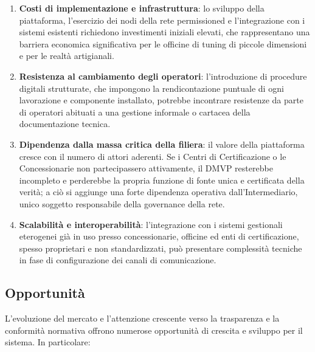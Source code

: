 \begin{enumerate}
    \item \textbf{Costi di implementazione e infrastruttura}: lo sviluppo della piattaforma, l'esercizio dei nodi della rete permissioned e l'integrazione con i sistemi esistenti richiedono investimenti iniziali elevati, che rappresentano una barriera economica significativa per le officine di tuning di piccole dimensioni e per le realtà artigianali.

    \item \textbf{Resistenza al cambiamento degli operatori}: l'introduzione di procedure digitali strutturate, che impongono la rendicontazione puntuale di ogni lavorazione e componente installato, potrebbe incontrare resistenze da parte di operatori abituati a una gestione informale o cartacea della documentazione tecnica.

    \item \textbf{Dipendenza dalla massa critica della filiera}: il valore della piattaforma cresce con il numero di attori aderenti. Se i Centri di Certificazione o le Concessionarie non partecipassero attivamente, il DMVP resterebbe incompleto e perderebbe la propria funzione di fonte unica e certificata della verità; a ciò si aggiunge una forte dipendenza operativa dall'Intermediario, unico soggetto responsabile della governance della rete.

    \item \textbf{Scalabilità e interoperabilità}: l'integrazione con i sistemi gestionali eterogenei già in uso presso concessionarie, officine ed enti di certificazione, spesso proprietari e non standardizzati, può presentare complessità tecniche in fase di configurazione dei canali di comunicazione.
\end{enumerate}

\subsection*{Opportunità}
L'evoluzione del mercato e l'attenzione crescente verso la trasparenza e la conformità normativa offrono numerose opportunità di crescita e sviluppo per il sistema. In particolare:

